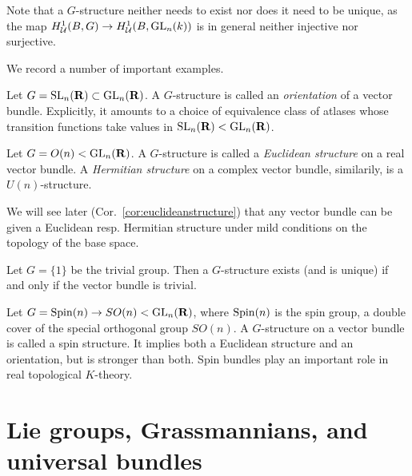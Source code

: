 \documentclass[a4paper,openany]{scrbook}
\DeclareMathOperator{\SL}{SL}
\begin{document}
Note that a $G$-structure neither needs to exist nor does it need to be unique, as the map $H^1_{\mathcal U}(B,G) \to H^1_{\mathcal U}(B,\operatorname{GL}_n(k))$ is in general neither injective nor surjective.

We record a number of important examples.

\begin{example}
Let $G = \SL_n(\R) \subset \GL_n(\R)$. A $G$-structure is called an \emph{orientation} of a vector bundle. Explicitly, it amounts to a choice of equivalence class of atlases whose transition functions take values in $\SL_n(\R) < \GL_n(\R)$.
\end{example}

\begin{example}
Let $G = O(n) < \operatorname{GL}_n(\mathbf R)$. A $G$-structure is called a \emph{Euclidean structure} on a real vector bundle. A \emph{Hermitian structure} on a complex vector bundle, similarily, is a $U(n)$-structure.
\end{example}

We will see later (Cor.~\ref{cor:euclideanstructure}) that any vector bundle can be given a Euclidean resp. Hermitian structure under mild conditions on the topology of the base space.

\begin{example}
Let $G = \{1\}$ be the trivial group. Then a $G$-structure exists (and is unique) if and only if the vector bundle is trivial.
\end{example}

\begin{example}
Let $G = \operatorname{Spin}(n) \to SO(n) < \operatorname{GL}_n(\mathbf R)$, where $\operatorname{Spin}(n)$ is the spin group, a double cover of the special orthogonal group $SO(n)$. A $G$-structure on a vector bundle is called a spin structure. It implies both a Euclidean structure and an orientation, but is stronger than both. Spin bundles play an important role in real topological $K$-theory.
\end{example}


\chapter{Lie groups, Grassmannians, and universal bundles}
\end{document}
